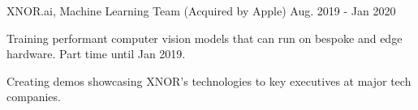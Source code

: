 \begin{cventries}
  \vspace{-0.4em}
  \cventry
    {XNOR.ai, Machine Learning Team (Acquired by Apple)}
    {}
    {}
    {Aug. 2019 - Jan 2020}
    {
      \begin{cvitems}
        \item {Training performant computer vision models that can run on bespoke and edge hardware. Part time until Jan 2019.}
        \item {Creating demos showcasing XNOR's technologies to key executives at major tech companies}. 
	\vspace{-1em}
      \end{cvitems}
    }

\begin{comment}
  OLD EXPERIENCES
  \cventry
    {Sift Science, Core Data}
    {Engineering Intern}
    {San Francisco, CA}
    {Jun. 2018 - Sep. 2018}
    {
      \begin{cvitems}
        \item {Rewrote HBase snapshot system, saving over \$1.5 million in S3 costs a year. Added BigQuery integration with HBase.}
      \end{cvitems}
    }

    \vspace{-0.3em}
  \cventry
    {Mode Lab, University of Washington CSE}
    {Undergraduate Research Assistant}
    {Seattle, WA}
    {Mar. 2018 - Sep. 2018}
    {
      \begin{cvitems}
        \item {Studying the application of linear dynamical systems (LDS) on creating sparse models for MEG data.}
        \item {Implemented stochastic gradient descent for inference of LDS using \textit{Python, numpy, Autograd, einsum2}}
      \end{cvitems}
    }
    \vspace{-1.2em}
  \cventry
    {Facebook, Ads Core}
    {Software Engineering Intern}
    {Seattle, WA}
    {Jun. 2017 - Sep. 2017}
    {
      \begin{cvitems}
    \item {Implemented back-end statistical models to predict demographics of ad reach for customers with multi-million yearly spend}
      \end{cvitems}
    }
    \vspace{-1.2em}


\end{comment}
\end{cventries}
